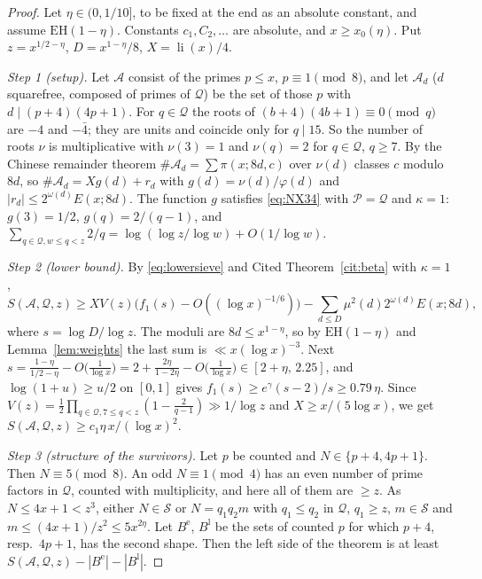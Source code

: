 \documentclass[11pt,reqno]{amsart}
\theoremstyle{definition}
\newcommand{\cS}{\mathcal S}
\newcommand{\cQ}{\mathcal Q}
\newcommand{\cA}{\mathcal A}
\newcommand{\li}{\operatorname{li}}
\newcommand{\EH}{\mathrm{EH}}
\begin{document}
\begin{proof}
Let $\eta\in(0,1/10]$, to be fixed at the end as an absolute constant, and
assume $\EH(1-\eta)$.  Constants $c_1,C_2,\dots$ are absolute, and $x\ge
x_0(\eta)$.  Put $z=x^{1/2-\eta}$, $D=x^{1-\eta}/8$, $X=\li(x)/4$.

\emph{Step 1 (setup).}  Let $\cA$ consist of the primes $p\le x$,
$p\equiv1\pmod8$, and let $\cA_d$ ($d$ squarefree, composed of primes of
$\cQ$) be the set of those $p$ with $d\mid(p+4)(4p+1)$.  For $q\in\cQ$ the
roots of $(b+4)(4b+1)\equiv0\pmod q$ are $-4$ and $-\bar4$; they are units
and coincide only for $q\mid15$.  So the number of roots $\nu$ is
multiplicative with $\nu(3)=1$ and $\nu(q)=2$ for $q\in\cQ$, $q\ge7$.  By
the Chinese remainder theorem $\#\cA_d=\sum\pi(x;8d,c)$ over $\nu(d)$
classes $c$ modulo $8d$, so $\#\cA_d=Xg(d)+r_d$ with $g(d)=\nu(d)/\varphi(d)$
and $|r_d|\le2^{\omega(d)}E(x;8d)$.  The function $g$ satisfies
\eqref{eq:NX34} with $\mathcal P=\cQ$ and $\kappa=1$: $g(3)=1/2$,
$g(q)=2/(q-1)$, and $\sum_{q\in\cQ,w\le q<z}2/q=\log(\log z/\log w)+O(1/\log w)$.

\emph{Step 2 (lower bound).}  By \eqref{eq:lowersieve} and Cited
Theorem~\ref{cit:beta} with $\kappa=1$,
\[
S(\cA,\cQ,z)\ge XV(z)\bigl(f_1(s)-O((\log x)^{-1/6})\bigr)-\sum_{d\le D}\mu^2(d)2^{\omega(d)}E(x;8d),
\]
where $s=\log D/\log z$.  The moduli are $8d\le x^{1-\eta}$, so by
$\EH(1-\eta)$ and Lemma~\ref{lem:weights} the last sum is
$\ll x(\log x)^{-3}$.  Next
$s=\frac{1-\eta}{1/2-\eta}-O\bigl(\frac1{\log x}\bigr)=2+\frac{2\eta}{1-2\eta}-O\bigl(\frac1{\log x}\bigr)\in[2+\eta,\,2.25]$,
and $\log(1+u)\ge u/2$ on $[0,1]$ gives
$f_1(s)\ge e^\gamma(s-2)/s\ge0.79\,\eta$.  Since
$V(z)=\frac12\prod_{q\in\cQ,7\le q<z}(1-\frac2{q-1})\gg1/\log z$ and
$X\ge x/(5\log x)$, we get $S(\cA,\cQ,z)\ge c_1\eta\,x/(\log x)^2$.

\emph{Step 3 (structure of the survivors).}  Let $p$ be counted and
$N\in\{p+4,4p+1\}$.  Then $N\equiv5\pmod8$.  An odd $N\equiv1\pmod4$ has
an even number of prime factors in $\cQ$, counted with multiplicity, and
here all of them are $\ge z$.  As $N\le4x+1<z^3$, either $N\in\cS$ or
$N=q_1q_2m$ with $q_1\le q_2$ in $\cQ$, $q_1\ge z$, $m\in\cS$ and
$m\le(4x+1)/z^2\le5x^{2\eta}$.  Let $B^{\mathrm e}$, $B^{\mathrm l}$ be the
sets of counted $p$ for which $p+4$, resp.\ $4p+1$, has the second shape.
Then the left side of the theorem is at least
$S(\cA,\cQ,z)-|B^{\mathrm e}|-|B^{\mathrm l}|$.


\end{proof}
\end{document}
